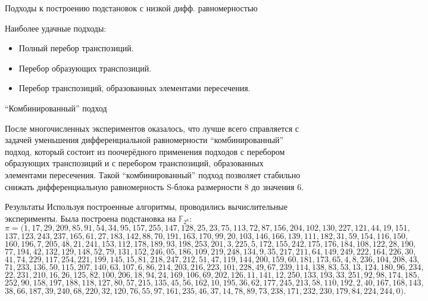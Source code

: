 \documentclass{beamer}
\begin{document}
\begin{frame}{Подходы к построению подстановок с низкой дифф. равномерностью}

Наиболее удачные подходы:

\begin{itemize}
\item Полный перебор транспозиций.
\item Перебор образующих транспозиций.
\item Перебор транспозиций, образованных элементами пересечения.
\end{itemize}

\end{frame}





\begin{frame}{``Комбинированный'' подход}

После многочисленных экспериментов оказалось, что лучше всего справляется с задачей уменьшения дифференциальной равномерности ``комбинированный'' подход, который состоит из поочерёдного применения подходов с перебором образующих транспозиций и с перебором транспозиций, образованных элементами пересечения. Такой ``комбинированный'' подход позволяет стабильно снижать дифференциальную равномерность S-блока размерности 8 до значения 6.

\end{frame}



\begin{frame}{Результаты}
Используя построенные алгоритмы, проводились вычислительные эксперименты. Была построена подстановка на $\mathbb{F}_{2^8}$:
$$\scriptscriptstyle \pi = (1, 17, 29, 209, 85, 91, 54, 34, 95, 157, 255, 147, 128, 25, 23, 75, 113, 72, 87, 156, 204, 102, 130,227, 121, 44, 19, 151, $$
$$\scriptscriptstyle137, 123, 243, 237, 165, 61, 27, 183, 142, 88, 70, 191, 163, 170, 99, 20, 103, 146, 166, 139, 111, 182, 31, 59, 154, 116, 150,$$
$$\scriptscriptstyle 160, 196, 7, 205, 48, 21, 241, 153, 112, 178, 189, 93, 198, 253, 201, 3, 225, 5, 172, 155, 242, 175, 176, 184, 108, 122, 28, 190,$$
$$\scriptscriptstyle 77, 194, 42, 132, 129, 148, 52, 79, 131, 152, 246,05, 186, 109, 219, 248, 134, 9, 35, 217, 211, 64, 149, 249, 222, 164, 226, 30, $$
$$\scriptscriptstyle41, 74, 229, 117, 254, 221, 199,145, 15, 81, 218, 247, 212, 51, 47, 119, 144, 200, 159, 60, 181, 173, 65, 4, 8, 236, 104, 208, 43, $$
$$\scriptscriptstyle71, 233, 136,50, 115, 207, 140, 63, 107, 6, 86, 214, 203, 216, 223, 101, 228, 49, 67, 239, 114, 138, 83, 53, 13, 124, 180, 96,234,$$
$$\scriptscriptstyle 22, 231, 210, 16, 26, 125, 82, 100, 206, 18, 94, 24, 169, 106, 69, 202, 126, 11, 141, 12, 250, 133, 193, 33,251, 92, 98, 174, 185,$$
$$\scriptscriptstyle 252, 90, 158, 197, 188, 118, 127, 80, 57, 215, 135, 45, 56, 162, 10, 195, 36, 62, 177, 245,213, 58, 110, 192, 2, 40, 167, 168, 143,$$
$$\scriptscriptstyle 38, 66, 187, 39, 240, 68, 220, 32, 120, 76, 55, 97, 161, 235, 46, 37, 14,78, 89, 73, 238, 171, 232, 230, 179, 84, 224, 244, 0).$$

\end{frame}
\end{document}
